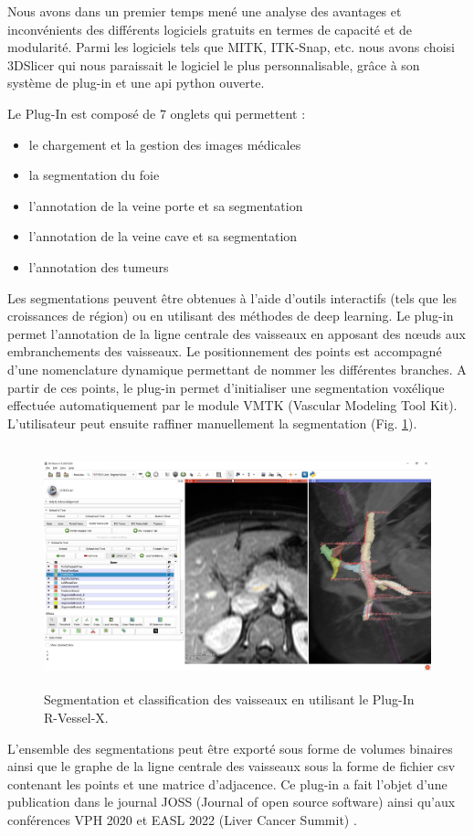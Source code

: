 Nous avons dans un premier temps mené une analyse des avantages et inconvénients des différents logiciels gratuits en termes de capacité et de modularité. Parmi les logiciels tels que MITK, ITK-Snap, etc. nous avons choisi 3DSlicer qui nous paraissait le logiciel le plus personnalisable, grâce à son système de plug-in et une api python ouverte.

Le Plug-In est composé de 7 onglets qui permettent :

\begin{itemize}
    \item le chargement et la gestion des images médicales
    \item la segmentation du foie 
    \item l'annotation de la veine porte et sa segmentation
    \item l'annotation de la veine cave et sa segmentation
    \item l'annotation des tumeurs
\end{itemize}

Les segmentations peuvent être obtenues à l'aide d'outils interactifs (tels que les croissances de région) ou en utilisant des méthodes de deep learning. 
Le plug-in permet l'annotation de la ligne centrale des vaisseaux en apposant des nœuds aux embranchements des vaisseaux. Le positionnement des points est accompagné d'une nomenclature dynamique permettant de nommer les différentes branches. A partir de ces points, le plug-in permet d'initialiser une segmentation voxélique effectuée automatiquement par le module VMTK (Vascular Modeling Tool Kit). L'utilisateur peut ensuite raffiner manuellement la segmentation (Fig. \ref{fig:slicer_plug_in}).

\begin{figure}[H]
    \includegraphics[height=7cm]{Images/plug_in_segmentation.png}
    \caption{Segmentation et classification des vaisseaux en utilisant le Plug-In R-Vessel-X.}
    \label{fig:slicer_plug_in}
\end{figure}

L'ensemble des segmentations peut être exporté sous forme de volumes binaires ainsi que le graphe de la ligne centrale des vaisseaux sous la forme de fichier csv contenant les points et une matrice d'adjacence.
Ce plug-in a fait l'objet d'une publication dans le journal JOSS (Journal of open source software) \cite{Lamy2022_JOSS} ainsi qu'aux conférences VPH 2020 \cite{Lamy2020_VPH_plugin} et EASL 2022 (Liver Cancer Summit) \cite{Lamy2022_EASL}.




